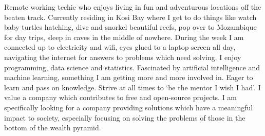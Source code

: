 

\begin{cvparagraph}

Remote working techie who enjoys living in fun and adventurous locations off the beaten track. Currently residing in Kosi Bay where I get to do
things like watch baby turtles hatching, dive and snorkel beautiful reefs, pop over to Mozambique for day trips, sleep in caves in the middle of
nowhere.
During the week I am connected up to electricity and wifi, eyes glued to a laptop screen all day, navigating the internet for answers to problems
which need solving. I enjoy programming, data science and statistics. Fascinated by artificial intelligence and machine learning, something I am
getting more and more involved in.
Eager to learn and pass on knowledge. Strive at all times to ‘be the mentor I wish I had’.
I value a company which contributes to free and open-source projects. I am specifically looking for a company providing solutions which have a
meaningful impact to society, especially focusing on solving the problems of those in the bottom of the wealth pyramid.
\end{cvparagraph}
